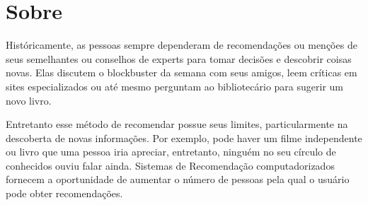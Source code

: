 \section{Sobre}
\par
Históricamente, as pessoas sempre dependeram de recomendações ou menções de seus semelhantes ou conselhos de experts para tomar decisões e descobrir coisas novas. Elas discutem o blockbuster da semana com seus amigos, leem críticas em sites especializados ou até mesmo perguntam ao bibliotecário para sugerir um novo livro.
\par
Entretanto esse método de recomendar possue seus limites, particularmente na descoberta de novas informações. Por exemplo, pode haver um filme independente ou livro que uma pessoa iria apreciar, entretanto, ninguém no seu círculo de conhecidos ouviu falar ainda. Sistemas de Recomendação computadorizados fornecem a oportunidade de aumentar o número de pessoas pela qual o usuário pode obter recomendações.
